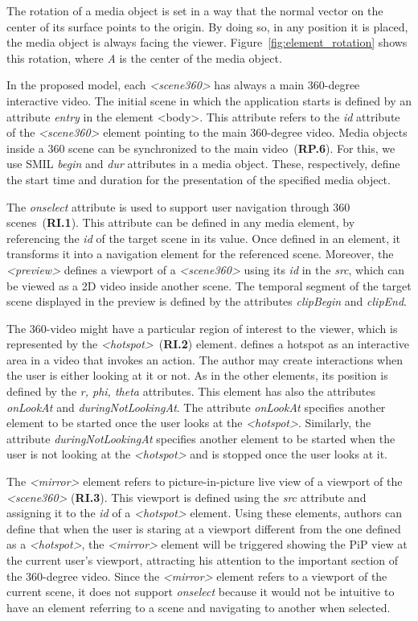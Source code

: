 The rotation of a media object is set in a way that the normal vector on the center of its surface points to the origin. By doing so, in any position it is placed, the media object is always facing the viewer. Figure~\ref{fig:element_rotation} shows this rotation, where \emph{A} is the center of the media object.

In the proposed model, each \emph{<scene360>} has always a main 360-degree interactive video. The initial scene in which the application starts is defined by an attribute \emph{entry} in the element <body>. This attribute refers to the \emph{id} attribute of the \emph{<scene360>} element pointing to the main 360-degree video. Media objects inside a 360 scene can be synchronized to the main video~(\textbf{RP.6}). For this, we use SMIL \emph{begin} and \emph{dur} attributes in a media object. These, respectively, define the start time and duration for the presentation of the specified media object.

The \emph{onselect} attribute is used to support user navigation through 360 scenes~(\textbf{RI.1}). This attribute can be defined in any media element, by referencing the \emph{id} of the target scene in its value. Once defined in an element, it transforms it into a navigation element for the referenced scene. Moreover, the \emph{<preview>} defines a viewport of a \emph{<scene360>} using its \emph{id} in the \emph{src}, which can be viewed as a 2D video inside another scene. The temporal segment of the target scene displayed in the preview is defined by the attributes \emph{clipBegin} and \emph{clipEnd}. 

The 360-video might have a particular region of interest to the viewer, which is represented by the \emph{<hotspot>}~(\textbf{RI.2}) element. \cite{Britta2017} defines a hotspot as an interactive area in a video that invokes an action. The author may create interactions when the user is either looking at it or not. As in the other elements, its position is defined by the \emph{r, phi, theta} attributes. This element has also the attributes \emph{onLookAt} and \emph{duringNotLookingAt}. The attribute \emph{onLookAt} specifies another element to be started once the user looks at the \emph{<hotspot>}. Similarly, the attribute \emph{duringNotLookingAt} specifies another element to be started when the user is not looking at the \emph{<hotspot>} and is stopped once the user looks at it.

The \emph{<mirror>} element refers to picture-in-picture live view of a viewport of the \emph{<scene360>} (\textbf{RI.3}). This viewport is defined using the \emph{src} attribute and assigning it to the \emph{id} of a \emph{<hotspot>} element. Using these elements, authors can define that when the user is staring at a viewport different from the one defined as a \emph{<hotspot>}, the \emph{<mirror>} element will be triggered showing the PiP view at the current user's viewport, attracting his attention to the important section of the 360-degree video. Since the \emph{<mirror>} element refers to a viewport of the current scene, it does not support \emph{onselect} because it would not be intuitive to have an element referring to a scene and navigating to another when selected.


